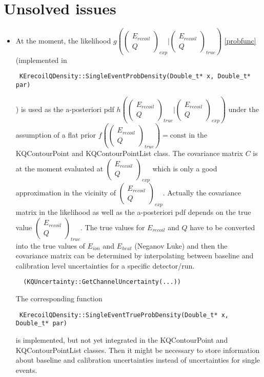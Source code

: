 \section{Unsolved issues}
\begin{itemize}
\item At the moment, the likelihood $g(\begin{pmatrix} E_{recoil} \\ Q \end{pmatrix}_{exp} | \begin{pmatrix} E_{recoil} \\ Q \end{pmatrix}_{true})$ \ref{probfunc} \\
(implemented in \begin{verbatim} KErecoilQDensity::SingleEventProbDensity(Double_t* x, Double_t* par) \end{verbatim}) is used as the a-posteriori pdf $h(\begin{pmatrix} E_{recoil} \\ Q \end{pmatrix}_{true} | \begin{pmatrix} E_{recoil} \\ Q \end{pmatrix}_{exp})$
under the assumption of a flat prior $f(\begin{pmatrix} E_{recoil} \\ Q \end{pmatrix}_{true}) = \mbox{const}$ in the KQContourPoint and KQContourPointList class. The covariance matrix $C$ is at the moment evaluated at $\begin{pmatrix} E_{recoil} \\ Q \end{pmatrix}_{exp}$ which is only a good approximation in the vicinity of $\begin{pmatrix} E_{recoil} \\ Q \end{pmatrix}_{exp}$. Actually the covariance matrix in the likelihood as well as the a-posteriori pdf depends on the true value $\begin{pmatrix} E_{recoil} \\ Q \end{pmatrix}_{true}$. The true values for $E_{recoil}$ and $Q$ have to be converted into the true values of $E_{ion}$ and $E_{heat}$ (Neganov Luke) and then the covariance matrix can be determined by interpolating between baseline and calibration level uncertainties for a specific detector/run. \\
\begin{verbatim}  (KQUncertainty::GetChannelUncertainty(...)) \end{verbatim}
The corresponding function
\begin{verbatim} KErecoilQDensity::SingleEventTrueProbDensity(Double_t* x, Double_t* par) \end{verbatim}
is implemented, but not yet integrated in the KQContourPoint and KQContourPointList classes.
Then it might be necessary to store information about baseline and calibration uncertainties instead of uncertainties for single events.

\end{itemize}